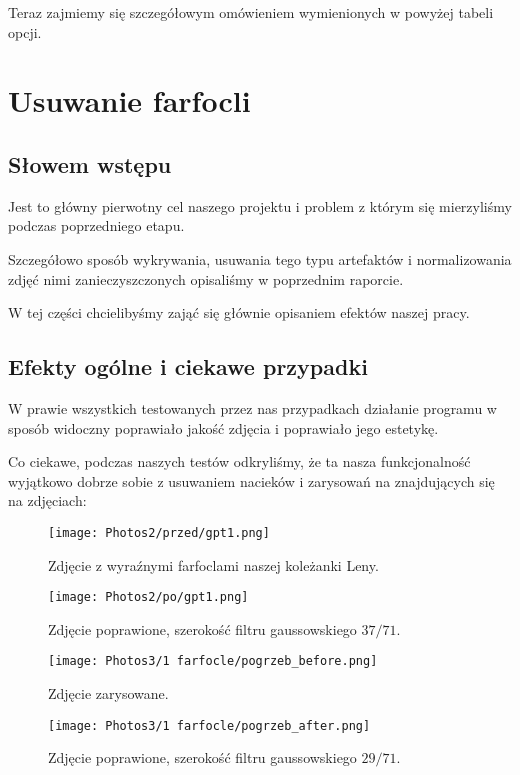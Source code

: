 \documentclass[]{mwart}
\begin{document}
Teraz zajmiemy się szczegółowym omówieniem wymienionych w powyżej tabeli opcji. \newpage






\section{Usuwanie farfocli}

\subsection{Słowem wstępu}
Jest to główny pierwotny cel naszego projektu i problem z którym się mierzyliśmy podczas poprzedniego etapu.

Szczegółowo sposób wykrywania, usuwania tego typu artefaktów i normalizowania
zdjęć nimi zanieczyszczonych opisaliśmy w poprzednim raporcie.

W tej części chcielibyśmy zająć się głównie opisaniem efektów naszej pracy.

\subsection{Efekty ogólne i ciekawe przypadki}
W prawie wszystkich testowanych przez nas przypadkach działanie programu w sposób widoczny poprawiało jakość zdjęcia i poprawiało jego estetykę.


Co ciekawe, podczas naszych testów odkryliśmy, że ta nasza funkcjonalność
wyjątkowo dobrze sobie z usuwaniem nacieków i zarysowań na znajdujących się na zdjęciach:

\begin{figure}[H]
    \centering
    \texttt{[image: Photos2/przed/gpt1.png]}
    \caption{Zdjęcie z wyraźnymi farfoclami naszej koleżanki Leny.}
\end{figure}
\begin{figure}[H]
    \centering
    \texttt{[image: Photos2/po/gpt1.png]}
    \caption{Zdjęcie poprawione, szerokość filtru gaussowskiego $37/71$.}
\end{figure}

\begin{figure}[H]
    \centering
    \texttt{[image: Photos3/1 farfocle/pogrzeb\_before.png]}
    \caption{Zdjęcie zarysowane.}
\end{figure}
\begin{figure}[H]
    \centering
    \texttt{[image: Photos3/1 farfocle/pogrzeb\_after.png]}
    \caption{Zdjęcie poprawione, szerokość filtru gaussowskiego $29/71$.}
\end{figure}
\end{document}
